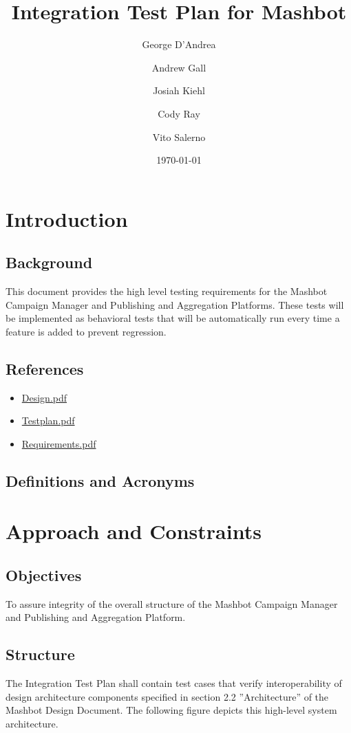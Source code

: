 \documentclass[12pt]{article}
\title{Integration Test Plan for Mashbot}
\author{George D'Andrea \and Andrew Gall \and Josiah Kiehl \and
  Cody Ray \and Vito Salerno}
\date{\today}
\begin{document}
\maketitle

\section{Introduction}
\subsection{Background}
This document provides the high level testing requirements for the Mashbot Campaign Manager and Publishing and Aggregation Platforms.  These tests will be implemented as behavioral tests that will be automatically run every time a feature is added to prevent regression.
\subsection{References}
\begin{itemize}
\item \href{http://mashbot.heroku.com/doc/Design.pdf}{Design.pdf}
\item \href{http://mashbot.heroku.com/doc/Testplan.pdf}{Testplan.pdf}
\item \href{http://mashbot.heroku.com/doc/Requirements.pdf}{Requirements.pdf}
\end{itemize}
\subsection{Definitions and Acronyms}

\section{Approach and Constraints}
\subsection{Objectives}
To assure integrity of the overall structure of the Mashbot Campaign Manager and Publishing and Aggregation Platform.
\subsection{Structure}

The Integration Test Plan shall contain test cases that verify
interoperability of design architecture components specified in
section 2.2 ”Architecture” of the Mashbot Design Document. The
following figure depicts this high-level system architecture.
\end{document}
